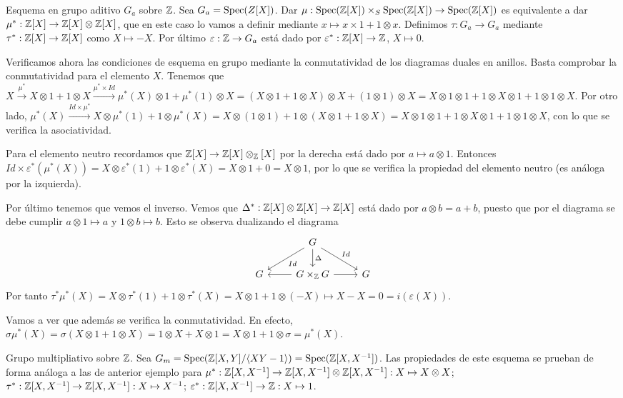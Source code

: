 \documentclass[GA.tex]{subfiles}
\begin{document}
\begin{ej}
Esquema en grupo aditivo $G_a$ sobre $\mathbb{Z}$. Sea $G_a=\operatorname{Spec}(Z[X])$. Dar $\mu:\operatorname{Spec}(\mathbb{Z}[X])\times_S\operatorname{Spec}(\mathbb{Z}[X])\to\operatorname{Spec}(\mathbb{Z}[X])$ es equivalente a dar $\mu^*:\mathbb{Z}[X]\to \mathbb{Z}[X]\otimes\mathbb{Z}[X]$, que en este caso lo vamos a definir mediante $x\mapsto x\times 1+1\otimes x$. Definimos $\tau:G_a\to G_a$ mediante $\tau^*:\mathbb{Z}[X]\to\mathbb{Z}[X]$ como $X\mapsto -X$. Por último $\varepsilon:\mathbb{Z}\to G_a$ está dado por $\varepsilon^*:\mathbb{Z}[X]\to\mathbb{Z}$, $X\mapsto 0$. 

Verificamos ahora las condiciones de esquema en grupo mediante la conmutatividad de los diagramas duales en anillos. Basta comprobar la conmutatividad para el elemento $X$. Tenemos que $X\xrightarrow{\mu^*}X\otimes 1+1\otimes X\xrightarrow{\mu^*\times Id} \mu^*(X)\otimes 1+\mu^*(1)\otimes X=(X\otimes 1+1\otimes X)\otimes X+(1\otimes 1)\otimes X=X\otimes 1\otimes 1+1\otimes X\otimes 1+1\otimes 1\otimes X$. Por otro lado, $\mu^*(X)\xrightarrow{Id\times\mu^*} X\otimes\mu^*(1)+1\otimes\mu^*(X)=X\otimes(1\otimes 1)+1\otimes(X\otimes 1+1\otimes X)=X\otimes 1\otimes 1+ 1\otimes X\otimes 1+1\otimes 1\otimes X$, con lo que se verifica la asociatividad. 

Para el elemento neutro recordamos que $\mathbb{Z}[X]\to\mathbb{Z}[X]\otimes_{\mathbb{Z}}[X]$ por la derecha está dado por $a\mapsto a\otimes 1$. Entonces $Id\times\varepsilon^*(\mu^*(X))=X\otimes \varepsilon^*(1)+1\otimes\varepsilon^*(X)=X\otimes 1+0=X\otimes 1$, por lo que se verifica la propiedad del elemento neutro (es análoga por la izquierda).

Por último tenemos que vemos el inverso. Vemos que $\Delta^*:\mathbb{Z}[X]\otimes\mathbb{Z}[X]\to \mathbb{Z}[X]$ está dado por $a\otimes b=a+b$, puesto que por el diagrama se debe cumplir $a\otimes 1\mapsto a$ y $1\otimes b\mapsto b$. Esto se observa dualizando el diagrama
\[
\begin{tikzcd}
& G\arrow[ld, "Id"] \arrow[rd, "Id"]\arrow[d, "\Delta"] & \\
G & G\times_\Z G\arrow[l]\arrow[r] & G
\end{tikzcd}
\]
Por tanto $\tau^*\mu^*(X)=X\otimes\tau^*(1)+1\otimes\tau^*(X)=X\otimes 1+1\otimes(-X)\mapsto X-X=0=i(\varepsilon(X))$. 

Vamos a ver que además se verifica la conmutatividad. En efecto, $\sigma\mu^*(X)=\sigma(X\otimes 1+1\otimes X)=1\otimes X+X\otimes 1=X\otimes 1+1\otimes \sigma=\mu^*(X)$. 
\end{ej}

\begin{ej}
Grupo multipliativo sobre $\mathbb{Z}$. Sea $G_m=\operatorname{Spec}(\mathbb{Z}[X,Y]/\langle{XY-1}\rangle)=\operatorname{Spec}(\mathbb{Z}[X,X^{-1}])$. Las propiedades de este esquema se prueban de forma análoga a las de anterior ejemplo para $\mu^*:\mathbb{Z}[X,X^{-1}]\to\mathbb{Z}[X,X^{-1}]\otimes \mathbb{Z}[X,X^{-1}]: X\mapsto X\otimes X$; $\tau^*:\mathbb{Z}[X,X^{-1}]\to \mathbb{Z}[X,X^{-1}]: X\mapsto X^{-1}$; $\varepsilon^*:\mathbb{Z}[X,X^{-1}]\to\mathbb{Z}: X\mapsto 1$. 
\end{ej}
\end{document}
